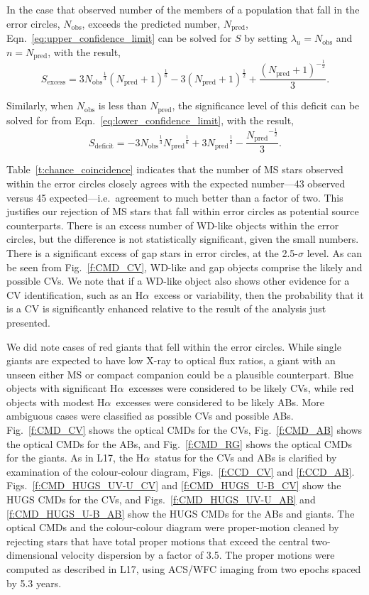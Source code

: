 \documentclass[fleqn,usenatbib]{mnras}
\newcommand{\ha}{\mbox{H$\alpha$}}
\newcommand{\no}{N_\mathrm{obs}}
\newcommand{\np}{N_\mathrm{pred}}
\begin{document}
{\noindent In the case that observed number of the members of a population that fall in the error circles, $\no$, exceeds the predicted number, $\np$, Eqn.~\ref{eq:upper_confidence_limit} can be solved for $S$ by setting $\lambda_u = \no$ and $n = \np$, with the result,
%
\begin{equation}
    S_\mathrm{excess} = 3{\no}^\frac{1}{3}(\np+1)^\frac{1}{6} - 3(\np+1)^\frac{1}{2} + \frac{(\np+1)^{-\frac{1}{2}}}{3} .
\end{equation}

\noindent Similarly, when $\no$ is less than $\np$, the significance level of this deficit can be solved for from Eqn.~\ref{eq:lower_confidence_limit}, with the result,
%
\begin{equation}
    S_\mathrm{deficit} = -3{\no}^\frac{1}{3}{\np}^\frac{1}{6} + 3{\np}^\frac{1}{2}-\frac{{\np}^{-\frac{1}{2}}}{3} .
\end{equation}

Table~\ref{t:chance_coincidence} indicates that the number of MS stars observed within the error circles closely agrees with the expected number---43 observed versus 45 expected---i.e.\ agreement to much better than a factor of two. This justifies our rejection of MS stars that fall within error circles as potential source counterparts. There is an excess number of WD-like objects within the error circles, but the difference is not statistically significant, given the small numbers. There is a significant excess of gap stars in error circles, at the 2.5-$\sigma$ level. As can be seen from Fig.~\ref{f:CMD_CV}, WD-like and gap objects comprise the likely and possible CVs. We note that if a WD-like object also shows other evidence for a CV identification, such as an \ha\ excess or variability, then the probability that it is a CV is significantly enhanced relative to the result of the analysis just presented. 
}

We did note cases of red giants %
that fell within the error circles. While single giants are expected to have low X-ray to optical flux ratios, a giant with an unseen either MS or compact companion could be a plausible counterpart. Blue objects with significant \ha\ excesses were considered to be likely CVs, while red objects with modest \ha\ excesses were considered to be likely ABs. More ambiguous cases were classified as possible CVs and possible ABs. Fig.~\ref{f:CMD_CV} shows the optical CMDs for the CVs, Fig.~\ref{f:CMD_AB} shows the optical CMDs for the ABs, and Fig.~\ref{f:CMD_RG} shows the optical CMDs for the giants. As in L17, the \ha\ status for the CVs and ABs is clarified by examination of the colour-colour diagram, Figs.~\ref{f:CCD_CV} and \ref{f:CCD_AB}. Figs.~\ref{f:CMD_HUGS_UV-U_CV} and \ref{f:CMD_HUGS_U-B_CV} show the HUGS CMDs for the CVs, and Figs.~\ref{f:CMD_HUGS_UV-U_AB} and \ref{f:CMD_HUGS_U-B_AB} show the HUGS CMDs for the ABs and giants. The optical CMDs and the colour-colour diagram were proper-motion cleaned by rejecting stars that have total proper motions that exceed the central two-dimensional velocity dispersion by a factor of 3.5. The proper motions were computed as described in L17, using ACS/WFC imaging from two epochs spaced by 5.3 years. 
\end{document}
